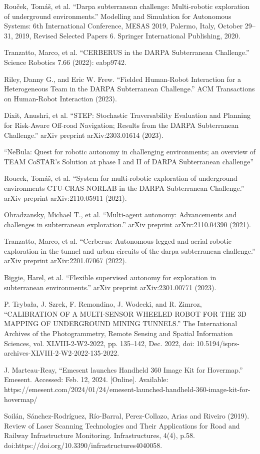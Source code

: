 \begin{thebibliography}{99}
	Rouček, Tomáš, et al. ``Darpa subterranean challenge: Multi-robotic exploration of underground environments.'' Modelling and Simulation for Autonomous Systems: 6th International Conference, MESAS 2019, Palermo, Italy, October 29–31, 2019, Revised Selected Papers 6. Springer International Publishing, 2020.
	
	 Tranzatto, Marco, et al. ``CERBERUS in the DARPA Subterranean Challenge.'' Science Robotics 7.66 (2022): eabp9742.
	
	 Riley, Danny G., and Eric W. Frew. ``Fielded Human-Robot Interaction for a Heterogeneous Team in the DARPA Subterranean Challenge.'' ACM Transactions on Human-Robot Interaction (2023).
	
	Dixit, Anushri, et al. ``STEP: Stochastic Traversability Evaluation and Planning for Risk-Aware Off-road Navigation; Results from the DARPA Subterranean Challenge.'' arXiv preprint arXiv:2303.01614 (2023).
	
	 ``NeBula: Quest for robotic autonomy in challenging environments; an overview of TEAM CoSTAR's Solution at phase I and II of DARPA Subterranean challenge''
	
	 Roucek, Tomáš, et al. ``System for multi-robotic exploration of underground environments CTU-CRAS-NORLAB in the DARPA Subterranean Challenge.'' arXiv preprint arXiv:2110.05911 (2021).
	
	 Ohradzansky, Michael T., et al. ``Multi-agent autonomy: Advancements and challenges in subterranean exploration.'' arXiv preprint arXiv:2110.04390 (2021).
	
	 Tranzatto, Marco, et al. ``Cerberus: Autonomous legged and aerial robotic exploration in the tunnel and urban circuits of the darpa subterranean challenge.'' arXiv preprint arXiv:2201.07067 (2022).
	
	 Biggie, Harel, et al. ``Flexible supervised autonomy for exploration in subterranean environments.'' arXiv preprint arXiv:2301.00771 (2023).

	 P. Trybała, J. Szrek, F. Remondino, J. Wodecki, and R. Zimroz, ``CALIBRATION OF A MULTI-SENSOR WHEELED ROBOT FOR THE 3D MAPPING OF UNDERGROUND MINING TUNNELS.'' The International Archives of the Photogrammetry, Remote Sensing and Spatial Information Sciences, vol. XLVIII-2-W2-2022, pp. 135–142, Dec. 2022, doi: 10.5194/isprs-archives-XLVIII-2-W2-2022-135-2022.

	 J. Marteau-Reay, ``Emesent launches Handheld 360 Image Kit for Hovermap.'' Emesent. Accessed: Feb. 12, 2024. [Online]. Available: https://emesent.com/2024/01/24/emesent-launched-handheld-360-image-kit-for-hovermap/

	 Soilán, Sánchez-Rodríguez, Río-Barral, Perez-Collazo, Arias and Riveiro (2019). Review of Laser Scanning Technologies and Their Applications for Road and Railway Infrastructure Monitoring. Infrastructures, 4(4), p.58. doi:https://doi.org/10.3390/infrastructures4040058.
	
\end{thebibliography}


